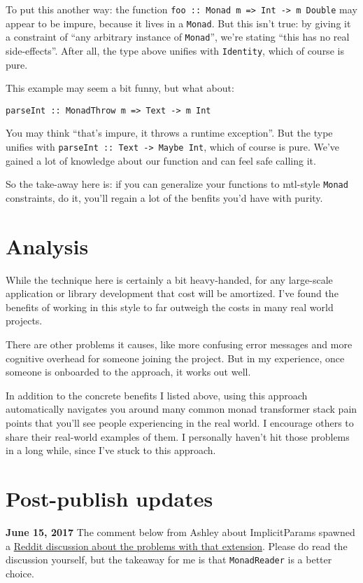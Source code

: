To put this another way: the function
\texttt{foo :: Monad m => Int -> m Double}
may appear to be impure, because it lives in a \texttt{Monad}. But this
isn't true: by giving it a constraint of ``any arbitrary instance of
\texttt{Monad}'', we're stating ``this has no real side-effects''. After
all, the type above unifies with \texttt{Identity}, which of course is
pure.

This example may seem a bit funny, but what about:
\begin{verbatim}
parseInt :: MonadThrow m => Text -> m Int
\end{verbatim}
You may think ``that's impure, it throws a runtime exception''. But the
type unifies with
\texttt{parseInt :: Text -> Maybe Int}, which of
course is pure. We've gained a lot of knowledge about our function and
can feel safe calling it.

So the take-away here is: if you can generalize your functions to
mtl-style \texttt{Monad} constraints, do it, you'll regain a lot of the
benfits you'd have with purity.

\section{Analysis}

While the technique here is certainly a bit heavy-handed, for any
large-scale application or library development that cost will be
amortized. I've found the benefits of working in this style to far
outweigh the costs in many real world projects.

There are other problems it causes, like more confusing error messages
and more cognitive overhead for someone joining the project. But in my
experience, once someone is onboarded to the approach, it works out
well.

In addition to the concrete benefits I listed above, using this approach
automatically navigates you around many common monad transformer stack
pain points that you'll see people experiencing in the real world. I
encourage others to share their real-world examples of them. I
personally haven't hit those problems in a long while, since I've stuck
to this approach.

\section{Post-publish updates}

\textbf{June 15, 2017} The comment below from Ashley about
ImplicitParams spawned a
\href{https://www.reddit.com/r/haskell/comments/6gz4w5/whats_wrong_with_implicitparams/}{Reddit
discussion about the problems with that extension}. Please do read the
discussion yourself, but the takeaway for me is that
\texttt{MonadReader} is a better
choice.
